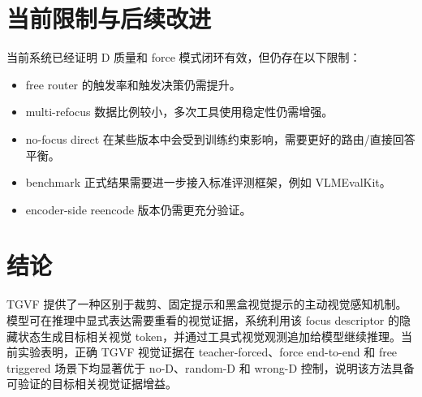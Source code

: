 \documentclass[10pt,twocolumn]{ctexart}
\begin{document}
\section{当前限制与后续改进}

当前系统已经证明 D 质量和 force 模式闭环有效，但仍存在以下限制：

\begin{itemize}
  \item free router 的触发率和触发决策仍需提升。
  \item multi-refocus 数据比例较小，多次工具使用稳定性仍需增强。
  \item no-focus direct 在某些版本中会受到训练约束影响，需要更好的路由/直接回答平衡。
  \item benchmark 正式结果需要进一步接入标准评测框架，例如 VLMEvalKit。
  \item encoder-side reencode 版本仍需更充分验证。
\end{itemize}

\section{结论}

TGVF 提供了一种区别于裁剪、固定提示和黑盒视觉提示的主动视觉感知机制。模型可在推理中显式表达需要重看的视觉证据，系统利用该 focus descriptor 的隐藏状态生成目标相关视觉 token，并通过工具式视觉观测追加给模型继续推理。当前实验表明，正确 TGVF 视觉证据在 teacher-forced、force end-to-end 和 free triggered 场景下均显著优于 no-D、random-D 和 wrong-D 控制，说明该方法具备可验证的目标相关视觉证据增益。
\end{document}
